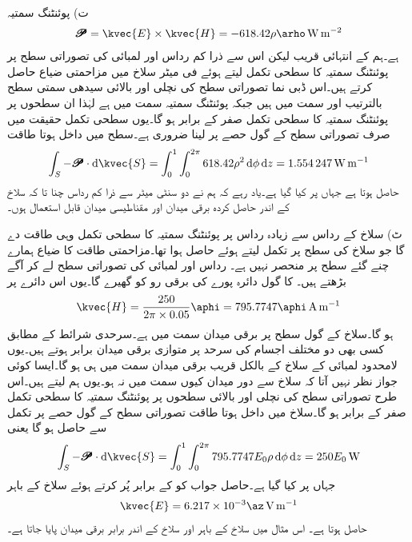 ت) پوئنٹنگ سمتیہ
\begin{align*}
\pmb{\mathscr{P}}=\kvec{E} \times \kvec{H}=-618.42 \rho \arho \, \si{\watt\per\meter\squared}
\end{align*}
 ہے۔ہم  کے انتہائی قریب لیکن اس سے ذرا کم رداس اور  لمبائی کی تصوراتی سطح پر پوئنٹنگ سمتیہ کا سطحی تکمل لیتے ہوئے فی میٹر سلاخ میں مزاحمتی ضیاع حاصل کرتے ہیں۔اس ڈبی نما تصوراتی سطح کی نچلی اور بالائی سیدھی سمتی سطح بالترتیب  اور  سمت میں ہیں جبکہ پوئنٹنگ سمتیہ  سمت میں ہے لہٰذا ان سطحوں پر پوئنٹنگ سمتیہ  کا سطحی تکمل صفر کے برابر ہو گا۔یوں سطحی تکمل حقیقت میں صرف تصوراتی سطح کے گول حصے پر لینا ضروری ہے۔سطح میں داخل ہوتا طاقت 
\begin{align*}
\int_S -\pmb{\mathscr{P}} \cdot \dif \kvec{S} =\int_{0}^{1} \int_{0}^{2\pi} 618.42 \rho^2 \dif \phi \dif z=\SI{1.554247}{\watt\per\meter}
\end{align*}
حاصل ہوتا ہے جہاں  پر کیا گیا ہے۔یاد رہے کہ ہم نے دو سنٹی میٹر سے ذرا کم رداس چنا تا کہ سلاخ کے اندر حاصل کردہ برقی میدان اور مقناطیسی میدان قابل استعمال ہوں۔

ٹ) سلاخ کے رداس سے زیادہ رداس پر پوئنٹنگ سمتیہ کا سطحی تکمل وہی طاقت دے گا جو سلاخ کی سطح پر تکمل لیتے ہوئے حاصل ہوا تھا۔مزاحمتی طاقت کا ضیاع ہمارے چنے گئے سطح پر منحصر نہیں ہے۔  رداس اور  لمبائی کی تصوراتی سطح لے کر آگے بڑھتے ہیں۔ کا گول دائرہ پورے  کی برقی رو کو گھیرے گا۔یوں اس دائرے پر 
\begin{align*}
\kvec{H}=\frac{250}{2\pi \times 0.05} \aphi=795.7747 \aphi \, \si{\ampere\per\meter}
\end{align*}
ہو گا۔سلاخ کے گول سطح پر برقی میدان  سمت میں ہے۔سرحدی شرائط کے مطابق کسی بھی دو مختلف اجسام کی سرحد پر متوازی برقی میدان برابر ہوتے ہیں۔یوں لامحدود لمبائی کے سلاخ کے بالکل قریب برقی میدان  سمت میں ہی ہو گا۔ایسا کوئی جواز نظر نہیں آتا کہ سلاخ سے دور میدان کیوں  سمت میں نہ ہو۔یوں ہم  لیتے ہیں۔اس طرح تصوراتی سطح کی نچلی اور بالائی سطحوں پر پوئنٹنگ سمتیہ کا سطحی تکمل صفر کے برابر ہو گا۔سلاخ میں داخل ہوتا طاقت  تصوراتی سطح کے گول حصے پر تکمل سے حاصل ہو گا یعنی
 \begin{align*}
\int_S -\pmb{\mathscr{P}} \cdot \dif \kvec{S} =\int_{0}^{1} \int_{0}^{2\pi} 795.7747 E_0 \rho \dif \phi \dif z=250 E_0 \, \si{\watt}
\end{align*}
جہاں  پر کیا گیا ہے۔حاصل جواب کو  کے برابر پُر کرتے ہوئے سلاخ کے باہر
\begin{align*}
\kvec{E}=6.217 \times 10^{-3} \az \, \si{\volt\per\meter}
\end{align*}
حاصل ہوتا ہے۔ اس مثال میں سلاخ کے باہر اور سلاخ کے اندر برابر برقی میدان پایا جاتا ہے۔


